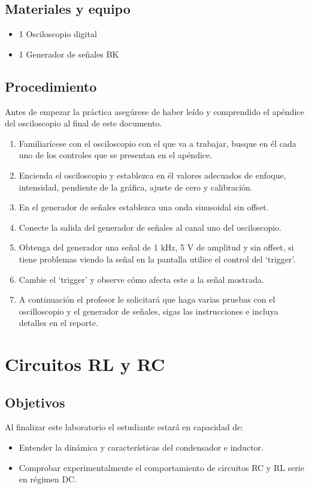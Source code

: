 \documentclass[12pt,letterpaper]{report}
\newcommand{\obj}{Objetivos}
\newcommand{\mat}{Materiales y equipo}
\newcommand{\pro}{Procedimiento}
\newcommand{\capacidad}{Al finalizar este laboratorio el estudiante estará en capacidad de:}
\begin{document}
\section{\mat}
\begin{itemize}
\item 1 Osciloscopio digital
\item 1 Generador de señales BK
\end{itemize}

\section{\pro}
Antes de empezar la práctica asegúrese de haber leído y comprendido el apéndice
del osciloscopio al final de este documento.

\begin{enumerate}
\item Familiarícese con el osciloscopio con el que va a trabajar, busque en él cada
uno de los controles que se presentan en el apéndice.
\item Encienda el osciloscopio y establezca en él valores adecuados de enfoque,
intensidad, pendiente de la gráfica, ajuste de cero y calibración.
\item En el generador de señales establezca una onda sinusoidal sin offset.
\item Conecte la salida del generador de señales al canal uno del osciloscopio.
\item Obtenga del generador una señal de 1 kHz, 5 V de amplitud y sin offset, si
tiene problemas viendo la señal en la pantalla utilice el control del ‘trigger’.
\item Cambie el ‘trigger’ y observe cómo afecta este a la señal mostrada.
\item A continuación el profesor le solicitará que haga varias pruebas con el oscilloscopio
y el generador de señales, sigas las instrucciones e incluya detalles en el reporte.
\end{enumerate}


\chapter{Circuitos RL y RC}

\section{\obj}
\capacidad
\begin{itemize}
\item Entender la dinámica y características del condensador e inductor.
\item Comprobar experimentalmente el comportamiento de circuitos RC y RL serie
en régimen DC.
\end{itemize}
\end{document}
